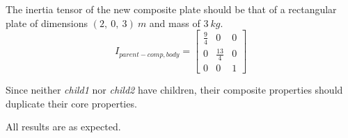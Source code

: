 \begin{description}
The inertia tensor of the new composite plate should be that of a rectangular
plate of dimensions $(2,~0,~3)~m$ and mass of $3~kg$.
\begin{equation*}
I_{parent-comp,body} =
   \begin{bmatrix} \frac{9}{4} & 0   & 0  \\
                   0   & \frac{13}{4} & 0   \\
                    0  & 0   & 1
   \end{bmatrix}
\end{equation*}

Since neither \textit{child1} nor \textit{child2} have children, their
composite properties should duplicate their core properties.

All results are as expected.
\end{description}






